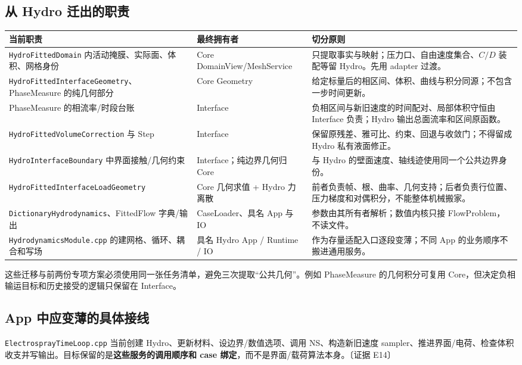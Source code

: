 \documentclass[UTF8,a4paper,11pt,fontset=fandol]{ctexart}
\newcommand{\code}[1]{\nolinkurl{#1}}
\newcommand{\ev}[1]{{\small\color{muted}〔证据 #1〕}}
\begin{document}
\subsection{从 Hydro 迁出的职责}
\begin{longtable}{@{}P{.30\textwidth}P{.30\textwidth}P{.34\textwidth}@{}}
\toprule 当前职责 & 最终拥有者 & 切分原则\\\midrule\endhead
\code{HydroFittedDomain} 内活动掩膜、实际面、体积、网格身份 & Core DomainView/MeshService & 只提取事实与映射；压力口、自由速度集合、$C/D$ 装配等留 Hydro。先用 adapter 过渡。\\
\code{HydroFittedInterfaceGeometry}、PhaseMeasure 的纯几何部分 & Core Geometry & 给定标量后的相区间、体积、曲线与积分同源；不包含一步时间更新。\\
PhaseMeasure 的相流率/时段台账 & Interface & 负相区间与新旧速度的时间配对、局部体积守恒由 Interface 负责；Hydro 输出总面流率和区间原函数。\\
\code{HydroFittedVolumeCorrection} 与 Step & Interface & 保留原残差、雅可比、约束、回退与收敛门；不得留成 Hydro 私有液面修正。\\
\code{HydroInterfaceBoundary} 中界面接触/几何约束 & Interface；纯边界几何归 Core & 与 Hydro 的壁面速度、轴线迹使用同一个公共边界身份。\\
\code{HydroFittedInterfaceLoadGeometry} & Core 几何求值 + Hydro 力离散 & 前者负责帧、根、曲率、几何支持；后者负责行位置、压力梯度和对偶积分，不能整体机械搬家。\\
\code{DictionaryHydrodynamics}、FittedFlow 字典/输出 & CaseLoader、具名 App 与 IO & 参数由其所有者解析；数值内核只接 FlowProblem，不读文件。\\
\code{HydrodynamicsModule.cpp} 的建网格、循环、耦合和写场 & 具名 Hydro App / Runtime / IO & 作为存量适配入口逐段变薄；不同 App 的业务顺序不搬进通用服务。\\
\bottomrule
\end{longtable}
这些迁移与前两份专项方案必须使用同一张任务清单，避免三次提取“公共几何”。例如 PhaseMeasure 的几何积分可复用 Core，但决定负相输运目标和历史接受的逻辑只保留在 Interface。

\subsection{App 中应变薄的具体接线}
\code{ElectrosprayTimeLoop.cpp} 当前创建 Hydro、更新材料、设边界/数值选项、调用 NS、构造新旧速度 sampler、推进界面/电荷、检查体积收支并写输出。目标保留的是\textbf{这些服务的调用顺序和 case 绑定}，而不是界面/载荷算法本身。\ev{E14}
\end{document}

